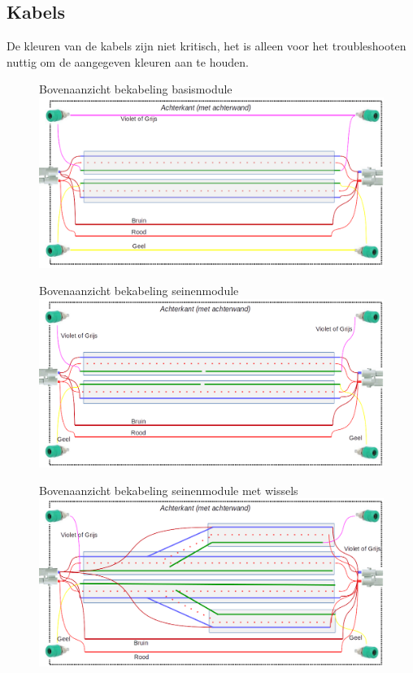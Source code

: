 \documentclass[12pt,a4paper]{report}
\begin{document}
\subsection{Kabels}
De kleuren van de kabels zijn niet kritisch, het is alleen voor het troubleshooten nuttig om de aangegeven kleuren aan te houden.

\begin{figure}[!ht]
  \captionbox
  {Bovenaanzicht bekabeling basismodule\label{im:modulebak}}
  {\includegraphics[scale=0.6]{images/rcu_modulebak}}
\end{figure}

\begin{figure}[!ht]
  \captionbox
  {Bovenaanzicht bekabeling seinenmodule\label{im:modulebak_seinen}}
  {\includegraphics[scale=0.6]{images/rcu_modulebak_seinen}}
\end{figure}

\begin{figure}[!ht]
  \captionbox
  {Bovenaanzicht bekabeling seinenmodule met wissels\label{im:modulebak_seinen_wissels}}
  {\includegraphics[scale=0.6]{images/rcu_modulebak_seinen_wissels}}
\end{figure}
\end{document}
